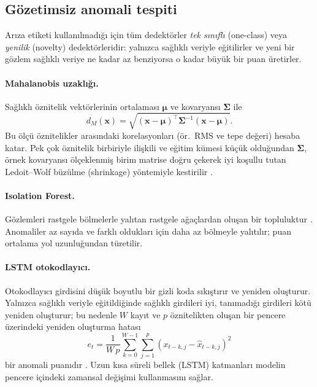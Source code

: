 \documentclass[11pt]{article}
\begin{document}
\subsection{Gözetimsiz anomali tespiti}
Arıza etiketi kullanılmadığı için tüm dedektörler \emph{tek sınıflı} (one-class) veya \emph{yenilik}
(novelty) dedektörleridir: yalnızca sağlıklı veriyle eğitilirler ve yeni bir gözlem sağlıklı veriye
ne kadar az benziyorsa o kadar büyük bir puan üretirler.

\paragraph{Mahalanobis uzaklığı.} Sağlıklı öznitelik vektörlerinin ortalaması $\boldsymbol\mu$ ve
kovaryansı $\boldsymbol\Sigma$ ile
\begin{equation}
d_M(\mathbf{x}) = \sqrt{(\mathbf{x}-\boldsymbol\mu)^\top \boldsymbol\Sigma^{-1}(\mathbf{x}-\boldsymbol\mu)}.
\end{equation}
Bu ölçü öznitelikler arasındaki korelasyonları (ör.\ RMS ve tepe değeri) hesaba katar. Pek çok
öznitelik birbiriyle ilişkili ve eğitim kümesi küçük olduğundan $\boldsymbol\Sigma$, örnek kovaryansı
ölçeklenmiş birim matrise doğru çekerek iyi koşullu tutan Ledoit--Wolf büzülme (shrinkage) yöntemiyle
kestirilir \cite{ledoit2004}.

\paragraph{Isolation Forest.} Gözlemleri rastgele bölmelerle yalıtan rastgele ağaçlardan oluşan bir
topluluktur \cite{liu2008}. Anomaliler az sayıda ve farklı oldukları için daha az bölmeyle yalıtılır;
puan ortalama yol uzunluğundan türetilir.

\paragraph{LSTM otokodlayıcı.} Otokodlayıcı girdisini düşük boyutlu bir gizli koda sıkıştırır ve
yeniden oluşturur. Yalnızca sağlıklı veriyle eğitildiğinde sağlıklı girdileri iyi, tanımadığı girdileri
kötü yeniden oluşturur; bu nedenle $W$ kayıt ve $p$ öznitelikten oluşan bir pencere üzerindeki
yeniden oluşturma hatası
\begin{equation}
e_t = \frac{1}{W\,p}\sum_{k=0}^{W-1}\sum_{j=1}^{p}\left(x_{t-k,j}-\hat{x}_{t-k,j}\right)^2
\end{equation}
bir anomali puanıdır \cite{malhotra2016}. Uzun kısa süreli bellek (LSTM) katmanları
\cite{hochreiter1997} modelin pencere içindeki zamansal değişimi kullanmasını sağlar.
\end{document}
